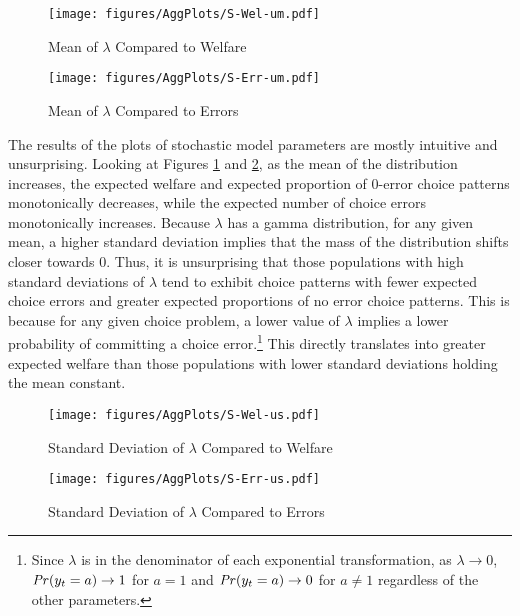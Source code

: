 \documentclass[../main.tex]{subfiles}
\begin{document}
\begin{figure}[h!]
	\center
	\caption{Mean of $\lambda$ Compared to Welfare}
	\texttt{[image: figures/AggPlots/S-Wel-um.pdf]}
	\label{fig:S-Wel-um}
\end{figure}

\begin{figure}[h!]
	\center
	\caption{Mean of $\lambda$ Compared to Errors}
	\texttt{[image: figures/AggPlots/S-Err-um.pdf]}
	\label{fig:S-Err-um}
\end{figure}

The results of the plots of stochastic model parameters are mostly intuitive and unsurprising.
Looking at Figures \ref{fig:S-Wel-um} and \ref{fig:S-Err-um}, as the mean of the distribution increases, the expected welfare and expected proportion of 0-error choice patterns monotonically decreases, while the expected number of choice errors monotonically increases.
Because $\lambda$ has a gamma distribution, for any given mean, a higher standard deviation implies that the mass of the distribution shifts closer towards $0$.
Thus, it is unsurprising that those populations with high standard deviations of $\lambda$ tend to exhibit choice patterns with fewer expected choice errors and greater expected proportions of no error choice patterns.
This is because for any given choice problem, a lower value of $\lambda$ implies a lower probability of committing a choice error.\footnote{
	Since $\lambda$ is in the denominator of each exponential transformation, as $\lambda \to 0$, ${\mathit{Pr}}(y_t = a) \to 1$ for $a = 1$ and ${\mathit{Pr}}(y_t = a) \to 0$ for $a\neq1$ regardless of the other parameters.
}
This directly translates into greater expected welfare than those populations with lower standard deviations holding the mean constant.

\begin{figure}[h!]
	\center
	\caption{Standard Deviation of $\lambda$ Compared to Welfare}
	\texttt{[image: figures/AggPlots/S-Wel-us.pdf]}
	\label{fig:S-Wel-us}
\end{figure}

\begin{figure}[h!]
	\center
	\caption{Standard Deviation of $\lambda$ Compared to Errors}
	\texttt{[image: figures/AggPlots/S-Err-us.pdf]}
	\label{fig:S-Err-us}
\end{figure}
\end{document}

